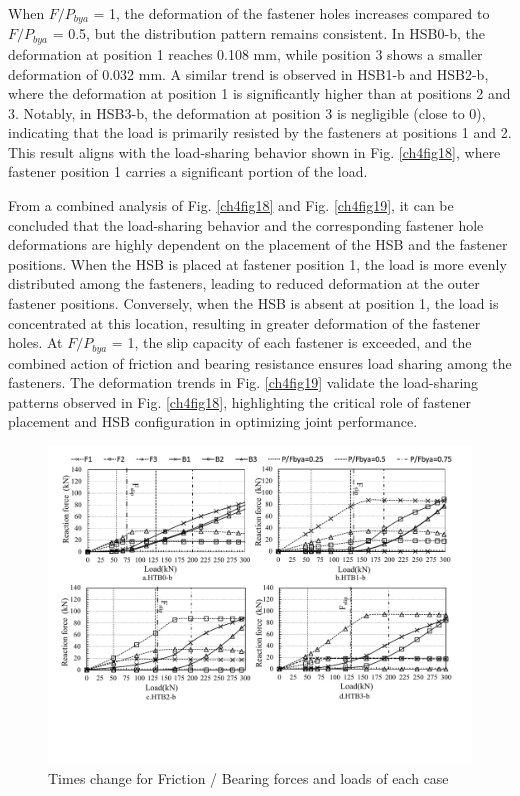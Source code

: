 When $F / P_{bya}$ = 1, the deformation of the fastener holes increases compared to $F / P_{bya}$ = 0.5, but the distribution pattern remains consistent. In HSB0-b, the deformation at position 1 reaches 0.108 mm, while position 3 shows a smaller deformation of 0.032 mm. A similar trend is observed in HSB1-b and HSB2-b, where the deformation at position 1 is significantly higher than at positions 2 and 3. Notably, in HSB3-b, the deformation at position 3 is negligible (close to 0), indicating that the load is primarily resisted by the fasteners at positions 1 and 2. This result aligns with the load-sharing behavior shown in Fig. \ref{ch4fig18}, where fastener position 1 carries a significant portion of the load.

From a combined analysis of Fig. \ref{ch4fig18} and Fig. \ref{ch4fig19}, it can be concluded that the load-sharing behavior and the corresponding fastener hole deformations are highly dependent on the placement of the \ac{HSB} and the fastener positions. When the \ac{HSB} is placed at fastener position 1, the load is more evenly distributed among the fasteners, leading to reduced deformation at the outer fastener positions. Conversely, when the \ac{HSB} is absent at position 1, the load is concentrated at this location, resulting in greater deformation of the fastener holes. At $F / P_{bya}$ = 1, the slip capacity of each fastener is exceeded, and the combined action of friction and bearing resistance ensures load sharing among the fasteners. The deformation trends in Fig. \ref{ch4fig19} validate the load-sharing patterns observed in Fig. \ref{ch4fig18}, highlighting the critical role of fastener placement and \ac{HSB} configuration in optimizing joint performance.

\begin{figure}[htbp]
    \centering
    \includegraphics[width=1\linewidth]{imgs//ch4/fast-time-load.pdf}
    \caption{Times change for Friction / Bearing forces and loads of each case}
    \label{fig-fastime}
\end{figure}

